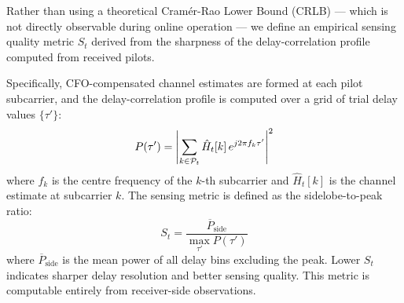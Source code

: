Rather than using a theoretical Cram\'{e}r-Rao Lower Bound (CRLB) — which is not directly observable during online operation — we define an empirical sensing quality metric $S_t$ derived from the sharpness of the delay-correlation profile computed from received pilots.

Specifically, CFO-compensated channel estimates are formed at each pilot subcarrier, and the delay-correlation profile is computed over a grid of trial delay values $\{\tau'\}$:
\begin{equation}
    P(\tau') = \left|\sum_{k \in \mathcal{P}_t} \hat{H}_t[k]\, e^{j2\pi f_k \tau'}\right|^2
    \label{eq:delay_profile}
\end{equation}
where $f_k$ is the centre frequency of the $k$-th subcarrier and $\hat{H}_t[k]$ is the channel estimate at subcarrier $k$. The sensing metric is defined as the sidelobe-to-peak ratio:
\begin{equation}
    S_t = \frac{\overline{P}_{\text{side}}}{\max_{\tau'} P(\tau')}
    \label{eq:sensing_metric}
\end{equation}
where $\overline{P}_{\text{side}}$ is the mean power of all delay bins excluding the peak. Lower $S_t$ indicates sharper delay resolution and better sensing quality. This metric is computable entirely from receiver-side observations.
